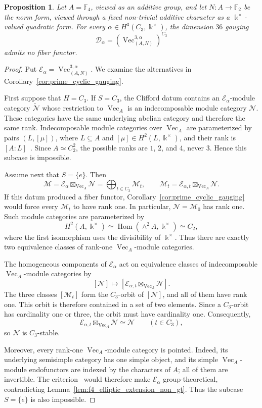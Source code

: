 \documentclass[12pt]{amsart}
\theoremstyle{plain}
\newtheorem{proposition}[theorem]{Proposition}
\theoremstyle{definition} %
\theoremstyle{remark} %
\newcommand{\ku}{{\Bbbk}} %
\DeclareMathOperator{\VecCat}{Vec}
\newcommand{\Vect}[1]{\VecCat_{#1}}
\newcommand{\cD}{\mathcal{D}}
\newcommand{\cE}{\mathcal{E}}
\newcommand{\cM}{\mathcal{M}}
\newcommand{\cN}{\mathcal{N}}
\newcommand{\Hom}{\operatorname{Hom}}
\begin{document}
\begin{proposition}\label{prop:dimension36_no_fiber}
Let $A=\mathbb{F}_4$, viewed as an additive group, and let $N:A\to\mathbb{F}_2$ be the norm form, viewed through a fixed non-trivial additive character as a $\ku^\times$-valued quadratic form. For every $\alpha\in H^3(C_3,\ku^\times)$, the dimension $36$ gauging
\[
\cD_\alpha=\left(\VecCat_{(A,N)}^{3,\alpha}\right)^{C_3}
\]
admits no fiber functor.
\end{proposition}

\begin{proof}
Put $\cE_\alpha=\VecCat_{(A,N)}^{3,\alpha}$. We examine the alternatives in Corollary~\ref{cor:prime_cyclic_gauging}.

First suppose that $H=C_3$. If $S=C_3$, the Clifford datum contains an $\cE_\alpha$-module category $\widetilde{\cN}$ whose restriction to $\Vect{A}$ is an indecomposable module category $\cN$. These categories have the same underlying abelian category and therefore the same rank. Indecomposable module categories over $\Vect{A}$ are parameterized by pairs $(L,[\mu])$, where $L\subseteq A$ and $[\mu]\in H^2(L,\ku^\times)$, and their rank is $[A:L]$~\cite[Section~2]{Nik08}. Since $A\simeq C_2^2$, the possible ranks are $1$, $2$, and $4$, never $3$. Hence this subcase is impossible.

Assume next that $S=\{e\}$. Then
\[
\cM=\cE_\alpha\boxtimes_{\Vect{A}}\cN
     =\bigoplus_{t\in C_3}\cM_t,
\qquad
\cM_t=\cE_{\alpha,t}\boxtimes_{\Vect{A}}\cN.
\]
If this datum produced a fiber functor, Corollary~\ref{cor:prime_cyclic_gauging} would force every $\cM_t$ to have rank one. In particular, $\cN=\cM_0$ has rank one. Such module categories are parameterized by
\[
H^2(A,\ku^\times)
\simeq \Hom(\wedge^2A,\ku^\times)
\simeq C_2,
\]
where the first isomorphism uses the divisibility of $\ku^\times$. Thus there are exactly two equivalence classes of rank-one $\Vect{A}$-module categories.

The homogeneous components of $\cE_\alpha$ act on equivalence classes of indecomposable $\Vect{A}$-module categories by
\[
[\cN]\longmapsto
[\cE_{\alpha,t}\boxtimes_{\Vect{A}}\cN].
\]
The three classes $[\cM_t]$ form the $C_3$-orbit of $[\cN]$, and all of them have rank one. This orbit is therefore contained in a set of two elements. Since a $C_3$-orbit has cardinality one or three, the orbit must have cardinality one. Consequently,
\[
\cE_{\alpha,t}\boxtimes_{\Vect{A}}\cN\simeq\cN
\qquad(t\in C_3),
\]
so $\cN$ is $C_3$-stable.

Moreover, every rank-one $\Vect{A}$-module category is pointed. Indeed, its underlying semisimple category has one simple object, and its simple $\Vect{A}$-module endofunctors are indexed by the characters of $A$; all of them are invertible. The criterion~\cite[Theorem~16]{MeMu12} would therefore make $\cE_\alpha$ group-theoretical, contradicting Lemma~\ref{lem:f4_elliptic_extension_non_gt}. Thus the subcase $S=\{e\}$ is also impossible.


\end{proof}
\end{document}
